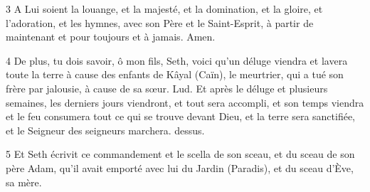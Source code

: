 \par 3 A Lui soient la louange, et la majesté, et la domination, et la gloire, et l'adoration, et les hymnes, avec son Père et le Saint-Esprit, à partir de maintenant et pour toujours et à jamais. Amen.

\par 4 De plus, tu dois savoir, ô mon fils, Seth, voici qu'un déluge viendra et lavera toute la terre à cause des enfants de Kâyal (Caïn), le meurtrier, qui a tué son frère par jalousie, à cause de sa sœur. Lud. Et après le déluge et plusieurs semaines, les derniers jours viendront, et tout sera accompli, et son temps viendra et le feu consumera tout ce qui se trouve devant Dieu, et la terre sera sanctifiée, et le Seigneur des seigneurs marchera. dessus.

\par 5 Et Seth écrivit ce commandement et le scella de son sceau, et du sceau de son père Adam, qu'il avait emporté avec lui du Jardin (Paradis), et du sceau d'Ève, sa mère.


